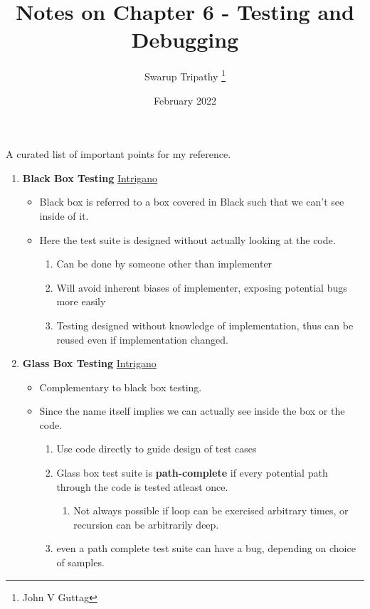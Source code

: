 \documentclass[11pt]{article}
\title{Notes on Chapter 6 - Testing and Debugging}
\author{Swarup Tripathy \thanks{John V Guttag}}
\date{February 2022}
\begin{document}
    \maketitle
    A curated list of important points for my reference.\\
    \begin{enumerate}
        \item \textbf{Black Box Testing} \href{https://www.youtube.com/watch?v=H7k3R1_A_yI}{Intrigano}
        \begin{itemize}
            \item Black box is referred to a box covered in Black such that we can't see inside of it.
            \item Here the test suite is designed without actually looking at the code.
            \begin{enumerate}
                \item Can be done by someone other than implementer
                \item Will avoid inherent biases of implementer, exposing potential bugs more easily
                \item Testing designed without knowledge of implementation, thus can be reused even if implementation changed.
            \end{enumerate}
        \end{itemize}
        \item \textbf{Glass Box Testing} \href{https://www.youtube.com/watch?v=cpJ5AjRl8gI}{Intrigano}
        \begin{itemize}
            \item Complementary to black box testing.
            \item Since the name itself implies we can actually see inside the box or the code.
            \begin{enumerate}
                \item Use code directly to guide design of test cases
                \item Glass box test suite is \textbf{path-complete} if every potential path through the code is tested atleast once.
                \begin{enumerate}
                    \item Not always possible if loop can be exercised arbitrary times, or recursion can be arbitrarily deep.
                \end{enumerate}
                \item even a path complete test suite can have a bug, depending on choice of samples. 

\end{enumerate}
\end{itemize}
\end{enumerate}
\end{document}
